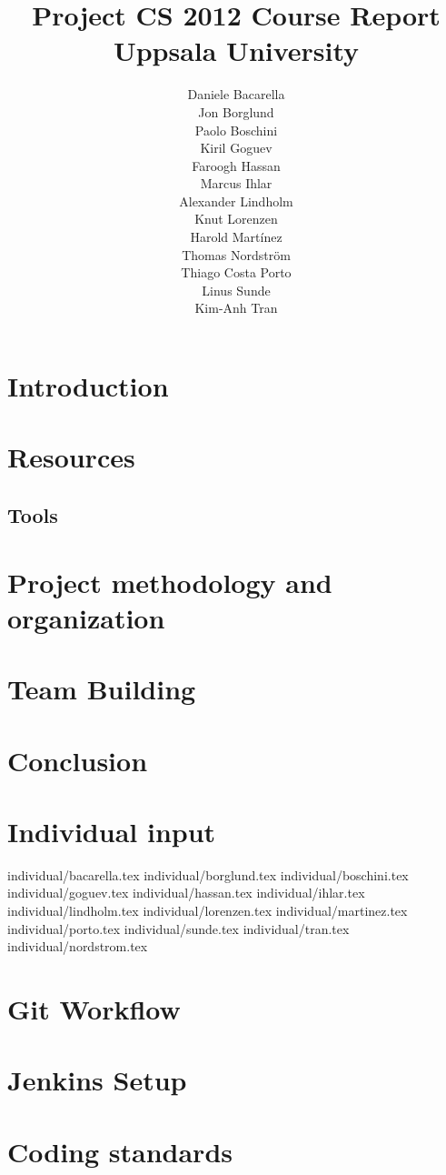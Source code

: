 \documentclass[11pt]{report}
\title{Project CS 2012 Course Report\\Uppsala University\\}
\author{Daniele Bacarella\\
		Jon Borglund\\
		Paolo Boschini\\
		Kiril Goguev\\
		Faroogh Hassan\\
		Marcus Ihlar\\
		Alexander Lindholm\\
		Knut Lorenzen\\
		Harold Mart\'{i}nez\\
		Thomas Nordstr\"om\\
		Thiago Costa Porto\\
		Linus Sunde\\
		Kim-Anh Tran
}
\date{}
\begin{document}
\maketitle



\begin{abstract}
 
\end{abstract}

\tableofcontents
 
\chapter{Introduction}

\chapter{Resources}





\section{Tools}
\label{sec:tools}




\chapter{Project methodology and organization}




\chapter{Team Building}

\chapter{Conclusion}



\appendix
\chapter{Individual input}
\label{indi-input}
 {individual/bacarella.tex}
 {individual/borglund.tex}
 {individual/boschini.tex}
 {individual/goguev.tex}
 {individual/hassan.tex}
 {individual/ihlar.tex}
 {individual/lindholm.tex}
 {individual/lorenzen.tex}
 {individual/martinez.tex}
 {individual/porto.tex}
 {individual/sunde.tex}
 {individual/tran.tex}
 {individual/nordstrom.tex}

\chapter{Git Workflow}
\label{git-work-app}

\chapter{Jenkins Setup}
\label{jenkins-app}

\chapter{Coding standards}



\end{document}
